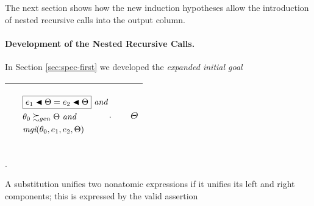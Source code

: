 \documentclass[runningheads]{llncs}
\DeclareMathOperator{\uand}{\emph{and}\,}
\DeclareMathOperator{\mgi}{\emph{mgi}}
\begin{document}
The next section shows how the new induction hypotheses allow the introduction of nested recursive calls into the output column.
\paragraph{Development of the Nested Recursive Calls.}

In Section \ref{sec:spec-first} we developed the \emph{expanded initial goal}

\begin{center}
\begin{tabularx}{1.0\textwidth} { 
  | >{\raggedright\arraybackslash}X 
  | >{\raggedright\arraybackslash}X 
  || >{\raggedright\arraybackslash}X | }
 \hline 
  & 
  \begin{center}\vspace{-.5cm} 
${\begin{aligned} 
&\begin{aligned}
&\boxed{\e{1} \apply \Theta = \e{2} \apply \Theta} \, \uand 
 \\
 \,\, & \thet{0} \moregen \Theta \, \uand
\\
  \,\, & {\mgi}(\thet{0}, \e{1}, \e{2}, \Theta)
\end{aligned}.\end{aligned}}$\hspace{1cm} 
\end{center} & \begin{center}$\Theta$ \end{center} \\
\hline
\end{tabularx}.
\end{center}




A substitution unifies two nonatomic expressions if it unifies its left and right components; this is expressed by the valid assertion
\end{document}

